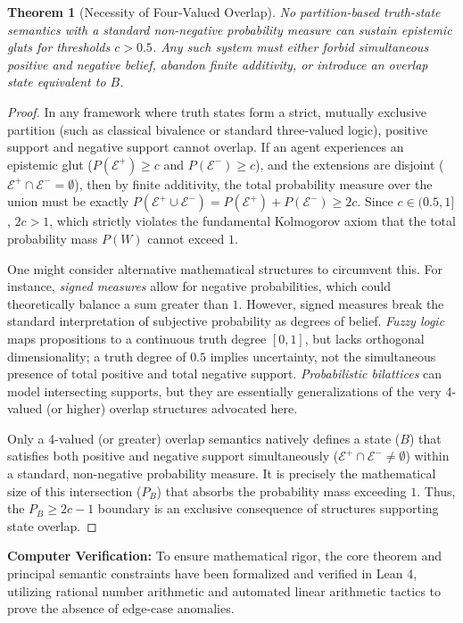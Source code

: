 \documentclass[11pt,a4paper]{article}
\newtheorem{theorem}{Theorem}[section]
\begin{document}
\begin{theorem}[Necessity of Four-Valued Overlap]
No partition-based truth-state semantics with a standard non-negative probability measure can sustain epistemic gluts for thresholds $c > 0.5$. Any such system must either forbid simultaneous positive and negative belief, abandon finite additivity, or introduce an overlap state equivalent to $B$.
\end{theorem}
\begin{proof}
In any framework where truth states form a strict, mutually exclusive partition (such as classical bivalence or standard three-valued logic), positive support and negative support cannot overlap. If an agent experiences an epistemic glut ($P(\mathcal{E}^+) \ge c$ and $P(\mathcal{E}^-) \ge c$), and the extensions are disjoint ($\mathcal{E}^+ \cap \mathcal{E}^- = \emptyset$), then by finite additivity, the total probability measure over the union must be exactly $P(\mathcal{E}^+ \cup \mathcal{E}^-) = P(\mathcal{E}^+) + P(\mathcal{E}^-) \ge 2c$. Since $c \in (0.5, 1]$, $2c > 1$, which strictly violates the fundamental Kolmogorov axiom that the total probability mass $P(W)$ cannot exceed $1$.

One might consider alternative mathematical structures to circumvent this. For instance, \textit{signed measures} allow for negative probabilities, which could theoretically balance a sum greater than $1$. However, signed measures break the standard interpretation of subjective probability as degrees of belief. \textit{Fuzzy logic} maps propositions to a continuous truth degree $[0, 1]$, but lacks orthogonal dimensionality; a truth degree of $0.5$ implies uncertainty, not the simultaneous presence of total positive and total negative support. \textit{Probabilistic bilattices} can model intersecting supports, but they are essentially generalizations of the very 4-valued (or higher) overlap structures advocated here.

Only a 4-valued (or greater) overlap semantics natively defines a state ($B$) that satisfies both positive and negative support simultaneously ($\mathcal{E}^+ \cap \mathcal{E}^- \neq \emptyset$) within a standard, non-negative probability measure. It is precisely the mathematical size of this intersection ($P_B$) that absorbs the probability mass exceeding $1$. Thus, the $P_B \ge 2c - 1$ boundary is an exclusive consequence of structures supporting state overlap.
\end{proof}

\textbf{Computer Verification:} To ensure mathematical rigor, the core theorem and principal semantic constraints have been formalized and verified in Lean 4, utilizing rational number arithmetic and automated linear arithmetic tactics to prove the absence of edge-case anomalies.
\end{document}
